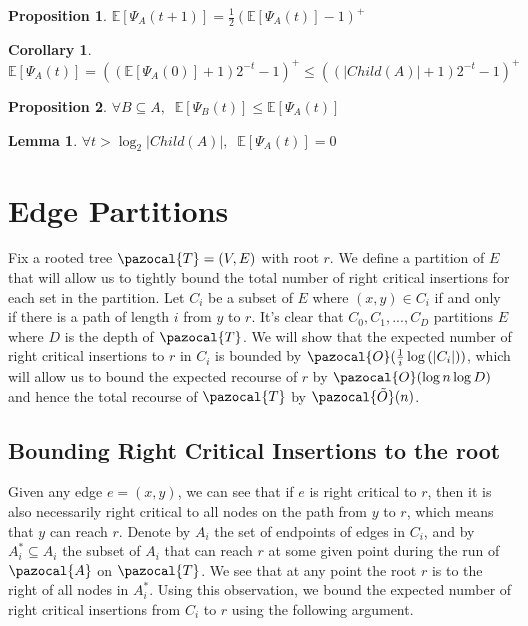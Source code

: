 \documentclass{article}
\newtheorem{lemma}{Lemma}
\newtheorem{corollary}{Corollary}
\newtheorem{proposition}{Proposition}
\begin{document}
\begin{proposition}
$\mathbb{E}[\Psi_A(t+1)] = \frac{1}{2}(\mathbb{E}[\Psi_A(t)] - 1)^+$
\end{proposition}

\begin{corollary}
$\mathbb{E}[\Psi_A(t)] = ((\mathbb{E}[\Psi_A(0)] + 1)2^{-t} - 1)^+ \leq ((\vert Child(A) \vert + 1)2^{-t} - 1)^+$
\end{corollary}

\begin{proposition}
$\forall B \subseteq A, \;\; \mathbb{E}[\Psi_B(t)] \leq \mathbb{E}[\Psi_A(t)]$
\end{proposition}

\begin{lemma}
$ \forall t > \log_2 \vert Child(A) \vert, \;\; \mathbb{E}[\Psi_{A}(t)] = 0$
\end{lemma}

\section{Edge Partitions}

Fix a rooted tree $\pazocal{T} = (V,E)$ with root $r$. We define a partition of $E$ that will allow us to tightly bound the total number of right critical insertions for each set in the partition. Let $C_i$ be a subset of $E$ where $(x,y) \in C_i$ if and only if there is a path of length $i$ from $y$ to $r$. It's clear that $C_0, C_1,..., C_D$ partitions $E$ where $D$ is the depth of $\pazocal{T}$. We will show that the expected number of right critical insertions to $r$ in $C_i$ is bounded by $\pazocal{O}(\frac{1}{i}\log{(\vert C_i \vert)})$, which will allow us to bound the expected recourse of $r$ by $\pazocal{O}(\log n\log D)$ and hence the total recourse of $\pazocal{T}$ by $\pazocal{\tilde O}(n)$.

\subsection{Bounding Right Critical Insertions to the root}

Given any edge $e=(x,y)$, we can see that if $e$ is right critical to $r$, then it is also necessarily right critical to all nodes on the path from $y$ to $r$, which means that $y$ can reach $r$. Denote by $A_i$ the set of endpoints of edges in $C_i$, and by $A^*_i \subseteq A_i$ the subset of $A_i$ that can reach $r$ at some given point during the run of $\pazocal{A}$ on $\pazocal{T}$. We see that at any point the root $r$ is to the right of all nodes in $A^*_i$. Using this observation, we bound the expected number of right critical insertions from $C_i$ to $r$ using the following argument.
\end{document}
